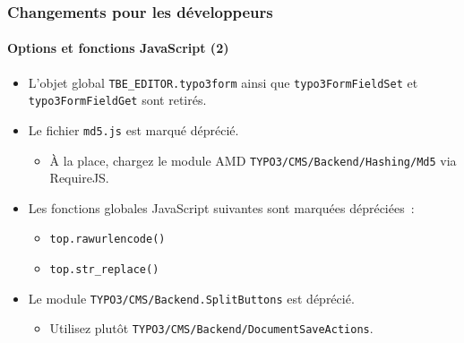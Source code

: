 \begin{frame}[fragile]
	\frametitle{Changements pour les développeurs}
	\framesubtitle{Options et fonctions JavaScript (2)}

	\begin{itemize}

		\item L'objet global \texttt{TBE\_EDITOR.typo3form} ainsi que \texttt{typo3FormFieldSet}
			et \texttt{typo3FormFieldGet} sont retirés.

		\item Le fichier \texttt{md5.js} est marqué déprécié.

			\begin{itemize}\smaller
				\item[\ding{228}] À la place, chargez le module AMD \texttt{TYPO3/CMS/Backend/Hashing/Md5} via RequireJS.
			\end{itemize}\normalsize

		\item Les fonctions globales JavaScript suivantes sont marquées dépréciées~:

		\begin{itemize}
			\item \texttt{top.rawurlencode()}
			\item \texttt{top.str\_replace()}
		\end{itemize}

		\item Le module \texttt{TYPO3/CMS/Backend.SplitButtons} est déprécié.

			\begin{itemize}\smaller
				\item[\ding{228}] Utilisez plutôt \texttt{TYPO3/CMS/Backend/DocumentSaveActions}.
			\end{itemize}\normalsize

 	\end{itemize}

\end{frame}


